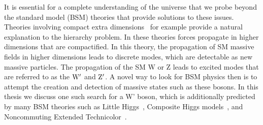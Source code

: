 It is essential for a complete understanding of the universe that we probe beyond the standard model (BSM) theories that provide solutions to these issues.  
Theories involving compact extra dimensions~\cite{PhysRevD.64.035002} for example provide a natural explanation to the hierarchy problem.  
In these theories forces propagate in higher dimensions that are compactified.   
In this theory, the propagation of SM massive fields in higher dimensions leads to discrete modes, which are detectable as new massive particles.  
The propagation of the SM W or Z leads to excited modes that are referred to as the $\mathrm{W}^{\prime}$ and $\mathrm{Z}^{\prime}$.
A novel way to look for BSM physics then is to attempt the creation and detection of massive states such as these bosons. 
In this thesis we discuss one such search for a W' boson, which is additionally predicted by many BSM theories such as Little Higgs~\cite{doi:10.1146/annurev.nucl.55.090704.151502}, 
Composite Higgs models~\cite{Vecchi:2013bja}, and Noncommuting Extended Technicolor~\cite{Chivukula:1995gu}.  



